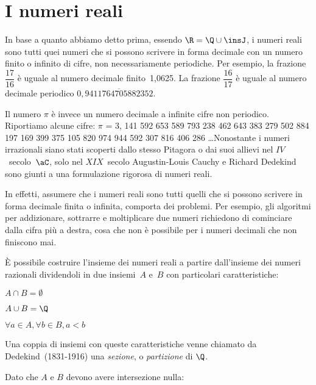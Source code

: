\section{I numeri reali}
In base a quanto abbiamo detto prima, essendo \(\R=\Q \cup \insJ\), i 
numeri 
reali sono tutti quei numeri che si possono scrivere in forma decimale con un 
numero finito o infinito di cifre, non necessariamente periodiche.
Per esempio, la frazione \(\dfrac{17}{16}\) è uguale al numero decimale 
finito~1,0625.
La frazione \(\dfrac{16}{17}\) è uguale al numero decimale periodico 
\(0,\overline{9411764705882352}\).

Il numero \(\pi\) è invece un numero decimale a infinite cifre non periodico. 
Riportiamo alcune cifre:
\(\pi \) = 3, 141 592 653 589 793 238 462 643 383 279 502 884 197 169 399 375 
105 
820 974 944 592 307 816 406 286
\ldots Nonostante i numeri 
irrazionali siano stati scoperti dallo stesso Pitagora o dai suoi allievi nel 
\(IV\)~secolo~\(\aC\), solo nel \(XIX\)~secolo Augustin-Louis Cauchy e 
Richard 
Dedekind sono giunti a una formulazione rigorosa di numeri reali.

In effetti, assumere che i numeri reali sono tutti quelli che si possono 
scrivere in forma decimale finita o infinita,  comporta dei problemi. 
Per esempio, gli algoritmi per addizionare, 
sottrarre e moltiplicare due numeri richiedono di cominciare dalla cifra 
più a destra, cosa che non è possibile per i numeri decimali che non 
finiscono mai. 

È possibile costruire l'insieme dei numeri reali a 
partire dall'insieme dei numeri razionali dividendoli in due insiemi~\(A\) 
e~\(B\) 
con particolari caratteristiche:
\begin{enumerate*}
 \item \(A \cap B=\emptyset\)
 \item \(A \cup B=\Q\)
 \item \(\forall a \in A, \forall b \in B, a<b\)
\end{enumerate*}

Una coppia di insiemi con queste caratteristiche venne chiamato da 
Dedekind~(1831-1916) una \emph{sezione}, o \emph{partizione} di \(\Q\).

Dato che \(A\) e \(B\) devono avere intersezione nulla:

